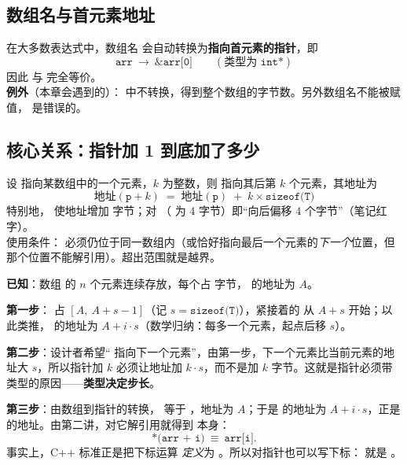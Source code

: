 \subsection{数组名与首元素地址}
\begin{definitionbox}[数组到指针的转换]
在大多数表达式中，数组名  会自动转换为\textbf{指向首元素的指针}，即
\[
\texttt{arr}\ \longrightarrow\ \texttt{\&arr[0]}\qquad(\text{类型为 } \texttt{int*})
\]
因此  与  完全等价。\\
\textbf{例外}（本章会遇到的）： 中不转换，得到整个数组的字节数。另外数组名不能被赋值， 是错误的。
\end{definitionbox}

\subsection{核心关系：指针加 1 到底加了多少}
\begin{formulabox}[指针算术]
设  指向某数组中的一个元素，$k$ 为整数，则  指向其后第 $k$ 个元素，其地址为
\[
\boxed{\ \text{地址}(\texttt{p}+k) \;=\; \text{地址}(\texttt{p}) \;+\; k\times\texttt{sizeof(T)}\ }
\]
特别地， 使地址增加  字节；对 （ 为 4 字节）即“向后偏移 4 个字节”（笔记红字）。\\
{\small 使用条件： 必须仍位于同一数组内（或恰好指向最后一个元素的\emph{下一个}位置，但那个位置不能解引用）。超出范围就是越界。}
\end{formulabox}

\begin{proofbox}
\textbf{已知}：数组  的 $n$ 个元素连续存放，每个占  字节， 的地址为 $A$。

\textbf{第一步}： 占 $[A,\ A+s-1]$（记 $s=\texttt{sizeof(T)}$），紧接着的  从 $A+s$ 开始；以此类推， 的地址为 $A+i\cdot s$（数学归纳：每多一个元素，起点后移 $s$）。

\textbf{第二步}：设计者希望“ 指向下一个元素”，由第一步，下一个元素比当前元素的地址大 $s$，所以指针加 $k$ 必须让地址加 $k\cdot s$，而不是加 $k$ 字节。这就是指针必须带类型的原因——\textbf{类型决定步长}。

\textbf{第三步}：由数组到指针的转换， 等于 ，地址为 $A$；于是  的地址为 $A+i\cdot s$，正是  的地址。由第二讲，对它解引用就得到  本身：
\[
\texttt{*(arr + i)}\ \equiv\ \texttt{arr[i]}.
\]
事实上，C++ 标准正是把下标运算  \emph{定义}为 。所以对指针也可以写下标： 就是 。
\end{proofbox}

